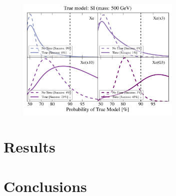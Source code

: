 \documentclass[11pt]{article}
\begin{document}
\begin{figure}
\centering
\includegraphics[width=0.7\textwidth]{plots/PDF_500GeV_SI_Higgs_50sims_Xe_Xe3x_Xe10x_XeG3_GF_TNT.pdf}
\caption{\label{fig:500gev_anapole_XeFull_TNT_GF}}
\end{figure}




\section{Results}

\section{Conclusions}





\end{document}
